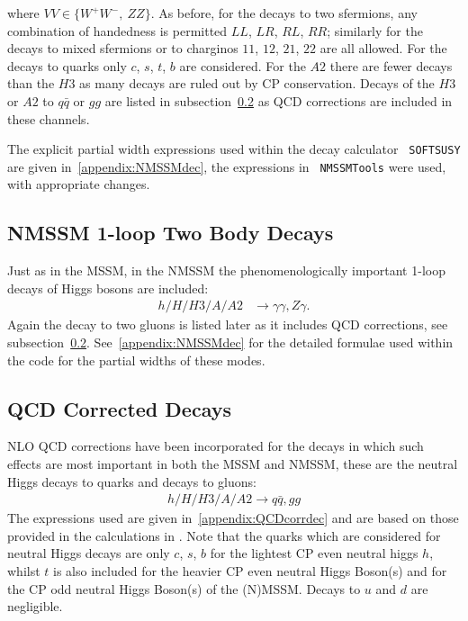\documentclass[final,3p,times]{elsarticle}
\begin{document}
where $VV \in \{W^+W^-,\ ZZ \}$.
As before, for the decays to two sfermions, any combination of handedness is
permitted $LL$, $LR$, $RL$, $RR$; similarly for the decays to mixed sfermions
or to charginos $11$, $12$, $21$, $22$ are all allowed. For the decays to
quarks only $c$, $s$, $t$, $b$ are considered. For the $A2$ there are fewer
decays than the $H3$ as many decays are ruled out by CP conservation. Decays 
of the $H3$ or $A2$ to $q \bar{q}$ or $gg$ are listed in subsection~\ref{ssec:QCD_Corrected_Decays}
as QCD corrections are included in these channels.

The explicit partial width expressions used within the decay calculator {\tt
  SOFTSUSY} are given in~\ref{appendix:NMSSMdec}, the expressions in {\tt
  NMSSMTools} \cite{Ellwanger:2004xm,Ellwanger:2012dd,Ellwanger:2006ch} were
used, with appropriate changes. 

\subsection{NMSSM 1-loop Two Body Decays}
Just as in the MSSM, in the NMSSM the phenomenologically important 1-loop decays of Higgs bosons are included:
\begin{align*}
h/H/H3/A/A2 &\rightarrow \gamma\gamma, Z\gamma.
\end{align*}
Again the decay to two gluons is listed later as it includes QCD corrections, see subsection~\ref{ssec:QCD_Corrected_Decays}.
See~\ref{appendix:NMSSMdec} for the detailed formulae used within the code for
the partial widths of these modes. 

\subsection{QCD Corrected Decays} \label{ssec:QCD_Corrected_Decays}
NLO QCD corrections have been incorporated for the decays in which such effects
are most important in both the MSSM and NMSSM, these are the neutral Higgs decays to quarks and decays to
gluons:
\begin{align*}
h/H/H3/A/A2 \rightarrow q \bar{q},  gg
\end{align*}
The expressions used are
given in~\ref{appendix:QCDcorrdec} and are based on those provided in the
calculations in \cite{Spira:2016,Djouadi:1996}. Note that the quarks which are considered for neutral Higgs
decays are only $c$, $s$, $b$ for the lightest CP even neutral higgs $h$, whilst $t$ is also included for the heavier CP
even neutral Higgs Boson(s) and for the CP odd neutral Higgs Boson(s) of the (N)MSSM\@. 
Decays to $u$ and $d$ are negligible.
\end{document}

